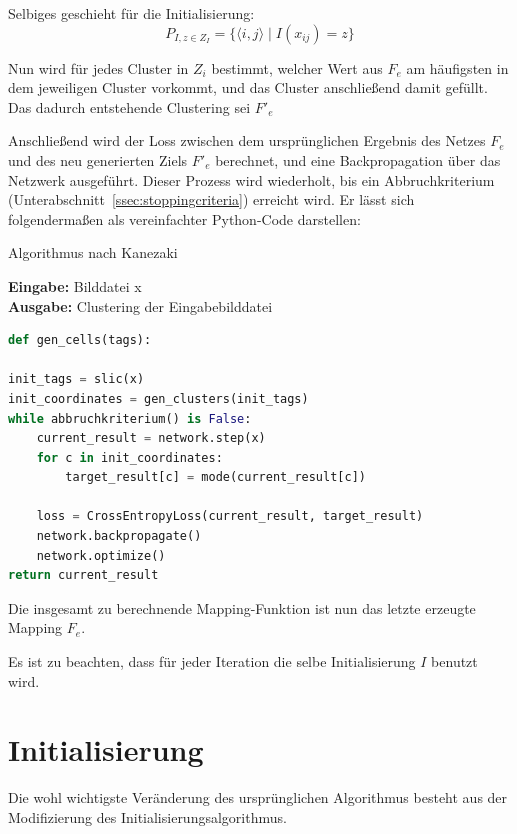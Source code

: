 Selbiges geschieht für die Initialisierung:
\begin{equation}
P_{I, z\in Z_I} = \{\langle i, j\rangle\mid I(x_{ij}) = z\}
\end{equation}

Nun wird für jedes Cluster in $Z_i$ bestimmt, welcher Wert aus $F_{e}$ am häufigsten in dem jeweiligen Cluster vorkommt, und das Cluster anschließend damit gefüllt. Das dadurch entstehende Clustering sei $F'_e$


Anschließend wird der Loss zwischen dem ursprünglichen Ergebnis des Netzes $F_e$ und des neu generierten Ziels $F'_e$ berechnet, und eine Backpropagation über das Netzwerk ausgeführt. Dieser Prozess wird wiederholt, bis ein Abbruchkriterium (\vgl Unterabschnitt~\ref{ssec:stoppingcriteria}) erreicht wird. Er lässt sich folgendermaßen als vereinfachter Python-Code darstellen:

\begin{algorithm}
\caption{Algorithmus nach Kanezaki \etal}
\textbf{Eingabe:} Bilddatei x \\
\textbf{Ausgabe:} Clustering der Eingabebilddatei 
\begin{lstlisting}[language=Python]
def gen_cells(tags):

init_tags = slic(x)
init_coordinates = gen_clusters(init_tags)
while abbruchkriterium() is False:
	current_result = network.step(x)
	for c in init_coordinates:
		target_result[c] = mode(current_result[c])
		
	loss = CrossEntropyLoss(current_result, target_result)
	network.backpropagate()
	network.optimize()
return current_result
\end{lstlisting}
\end{algorithm}

Die insgesamt zu berechnende Mapping-Funktion ist nun das letzte erzeugte Mapping $F_e$.

Es ist zu beachten, dass für jeder Iteration die selbe Initialisierung $I$ benutzt wird.

\section{Initialisierung}
\label{sec:initialization}

Die wohl wichtigste Veränderung des ursprünglichen Algorithmus besteht aus der Modifizierung des Initialisierungsalgorithmus.

